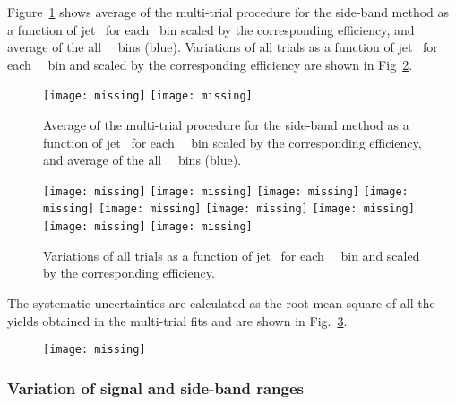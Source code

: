 Figure~\ref{fig:MultiTrialSB_trials_pPB_Dzero} shows average of the multi-trial procedure for the side-band method as a function of jet \pt\ for each \Dzero \pt\ bin scaled by the corresponding efficiency, and average of the all \Dzero\ \pt\ bins (blue). 
Variations of all trials as a function of jet \pt\ for each \Dzero\ \pt\ bin and scaled by the corresponding efficiency are shown in Fig~\ref{fig:MultiTrialSB_allDptVairations_pPB_Dzero}.

\begin{figure}[bth]
\begin{center}
\texttt{[image: missing]}
\texttt{[image: missing]}
\caption{Average of the multi-trial procedure for the side-band method as a function of jet \pt\ for each \Dzero\ \pt\ bin scaled by the corresponding efficiency, and average of the all \Dzero\ \pt\ bins (blue).} 
\label{fig:MultiTrialSB_trials_pPB_Dzero}
\end{center}
\end{figure}

\begin{figure}[bth]
\begin{center}
\texttt{[image: missing]}
\texttt{[image: missing]}
\texttt{[image: missing]}
\texttt{[image: missing]}
\texttt{[image: missing]}
\texttt{[image: missing]}
\texttt{[image: missing]}
\texttt{[image: missing]}
\texttt{[image: missing]}
\caption{Variations of all trials as a function of jet \pt\ for each \Dzero\ \pt\ bin and scaled by the corresponding efficiency.} 
\label{fig:MultiTrialSB_allDptVairations_pPB_Dzero}
\end{center}
\end{figure}

The systematic uncertainties are calculated as the root-mean-square of all the yields obtained in the multi-trial fits and are shown in Fig.~\ref{fig:MultiTrialRMS_pPB_Dzero}.
\begin{figure}[bth]
\begin{center}
\texttt{[image: missing]} 
\label{fig:MultiTrialRMS_pPB_Dzero}
\end{center}
\end{figure}


\subsubsection{Variation of signal and side-band ranges}


